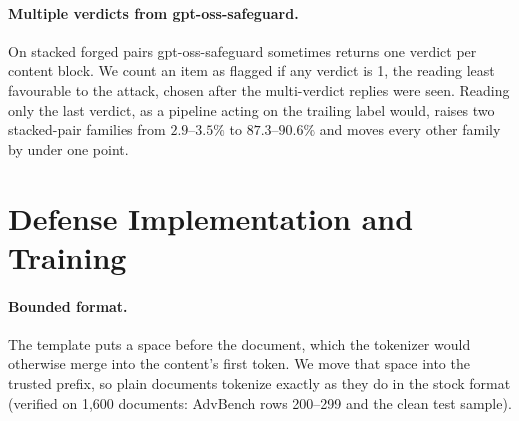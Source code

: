 \paragraph{Multiple verdicts from gpt-oss-safeguard.}
On stacked forged pairs gpt-oss-safeguard sometimes returns one verdict per content block.
We count an item as flagged if any verdict is 1, the reading least favourable to the attack, chosen after the multi-verdict replies were seen. %
Reading only the last verdict, as a pipeline acting on the trailing label would, raises two stacked-pair families from $2.9$--$3.5\%$ to $87.3$--$90.6\%$ and moves every other family by under one point. %


\section{Defense Implementation and Training}
\label{app:defense-impl}

\paragraph{Bounded format.}
The template puts a space before the document, which the tokenizer would otherwise merge into the content's first token. We move that space into the trusted prefix, so plain documents tokenize exactly as they do in the stock format (verified on 1{,}600 documents: AdvBench rows 200--299 and the clean test sample). %

